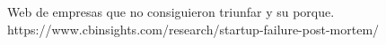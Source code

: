 % 

\begin{thebibliography}{99}

\emph{} Web de empresas que no consiguieron triunfar y su porque. https://www.cbinsights.com/research/startup-failure-post-mortem/

\end{thebibliography}
